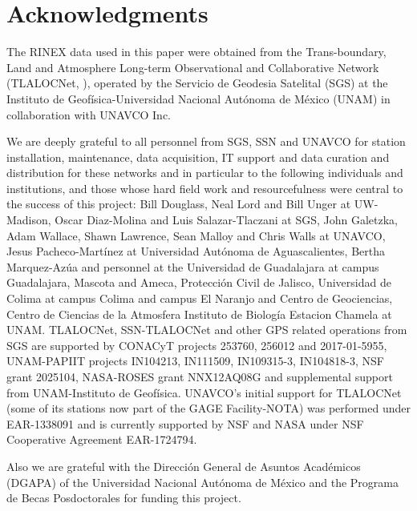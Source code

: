 \documentclass[times,twocolumn,final,authoryear]{elsarticle}
\begin{document}
\section{Acknowledgments}

The RINEX data used in this paper were obtained from the Trans-boundary, Land and Atmosphere Long-term Observational and Collaborative Network (TLALOCNet, \citet{Cabral-Cano:2018}), operated by the Servicio de Geodesia Satelital (SGS) at the Instituto de Geofísica-Universidad Nacional Autónoma de México (UNAM) in collaboration with UNAVCO Inc. 

We are deeply grateful to all personnel from SGS, SSN and UNAVCO for station installation, maintenance, data acquisition, IT support and data curation and distribution for these networks and in particular to the following individuals and institutions, and those whose hard field work and resourcefulness were central to the success of this project: Bill Douglass, Neal Lord and Bill Unger at UW-Madison, Oscar Diaz-Molina and Luis Salazar-Tlaczani at SGS, John Galetzka, Adam Wallace, Shawn Lawrence, Sean Malloy and Chris Walls at UNAVCO, Jesus Pacheco-Martínez at Universidad Autónoma de Aguascalientes, Bertha Marquez-Azúa and personnel at the Universidad de Guadalajara at campus Guadalajara, Mascota and Ameca, Protección Civil de Jalisco, Universidad de Colima at campus Colima and campus El Naranjo and Centro de Geociencias, Centro de Ciencias de la Atmosfera Instituto de Biología Estacion Chamela at UNAM.
TLALOCNet, SSN-TLALOCNet and other GPS related operations from SGS are supported by CONACyT projects 253760, 256012 and 2017-01-5955, UNAM-PAPIIT projects IN104213, IN111509, IN109315-3, IN104818-3, NSF grant 2025104, NASA-ROSES grant NNX12AQ08G and supplemental support from UNAM-Instituto de Geofísica. UNAVCO's initial support for TLALOCNet (some of its stations now part of the GAGE Facility-NOTA) was performed under EAR-1338091 and is currently supported by NSF and NASA under NSF Cooperative Agreement EAR-1724794.

Also we are grateful with the Direcci\'on General de Asuntos Acad\'emicos (DGAPA) of the Universidad Nacional Aut\'onoma de M\'exico and the Programa de Becas Posdoctorales for funding this project.



\end{document}
